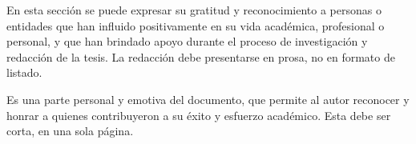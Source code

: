 En esta sección se puede expresar su gratitud y reconocimiento a personas o entidades que han influido positivamente en su vida académica, profesional o personal, y que han brindado apoyo durante el proceso de investigación y redacción de la tesis. La redacción debe presentarse en prosa, no en formato de listado. 

Es una parte personal y emotiva del documento, que permite al autor reconocer y honrar a quienes contribuyeron a su éxito y esfuerzo académico. Esta debe ser corta, en una sola página.